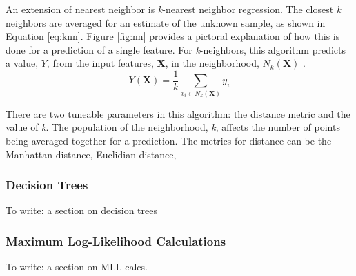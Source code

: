 An extension of nearest neighbor is \textit{k}-nearest neighbor regression.
The closest \textit{k} neighbors are averaged for an estimate of the unknown
sample, as shown in Equation \ref{eq:knn}.  Figure \ref{fig:nn} provides a
pictoral explanation of how this is done for a prediction of a single feature.
For \textit{k}-neighbors, this algorithm predicts a value, $Y$, from the input
features, $\boldsymbol{X}$, in the neighborhood, $N_k (\boldsymbol{X})$
\cite{elements_stats}. 
\begin{equation}
  Y(\boldsymbol{X}) = \frac{1}{k} \sum_{x_i \in N_k(\boldsymbol{X})} y_i
  \label{eq:knn}
\end{equation}

There are two tuneable parameters in this algorithm: the distance metric and
the value of \textit{k}.  The population of the neighborhood, \textit{k},
affects the number of points being averaged together for a prediction.  The
metrics for distance can be the Manhattan distance, Euclidian distance, 

\subsubsection{Decision Trees}
To write: a section on decision trees

\subsubsection{Maximum Log-Likelihood Calculations}
To write: a section on \gls{MLL} calcs.
